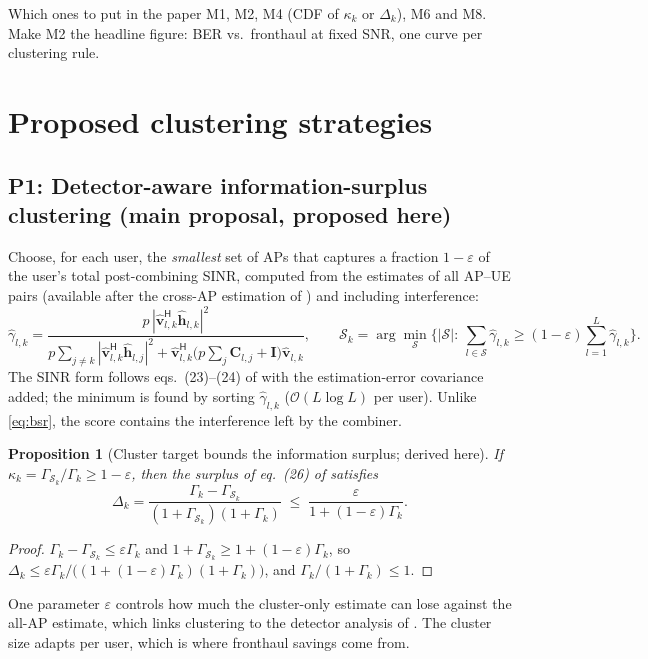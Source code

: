 \documentclass[11pt]{article}
\newtheorem{proposition}{Proposition}
\begin{document}
\begin{keybox}{Which ones to put in the paper}
M1, M2, M4 (CDF of $\kappa_k$ or $\Delta_k$), M6 and M8. Make M2 the headline figure: BER vs.\ fronthaul at fixed SNR, one curve per clustering rule.
\end{keybox}

\section{Proposed clustering strategies}
\label{sec:proposals}

\subsection{P1: Detector-aware information-surplus clustering (main proposal, proposed here)}
Choose, for each user, the \emph{smallest} set of APs that captures a fraction $1-\varepsilon$ of the user's total post-combining SINR, computed from the estimates of all AP--UE pairs (available after the cross-AP estimation of \cite{haider2026vtc}) and including interference:
\begin{equation}
  \hat\gamma_{l,k}=\frac{p\,|\hat{\mathbf v}_{l,k}^{\mathsf H}\hat{\mathbf h}_{l,k}|^2}
  {p\sum_{j\ne k}|\hat{\mathbf v}_{l,k}^{\mathsf H}\hat{\mathbf h}_{l,j}|^2+\hat{\mathbf v}_{l,k}^{\mathsf H}\big(p\sum_j\mathbf C_{l,j}+\mathbf I\big)\hat{\mathbf v}_{l,k}},
  \qquad
  \mathcal S_k=\arg\min_{\mathcal S}\Big\{|\mathcal S|:\ \sum_{l\in\mathcal S}\hat\gamma_{l,k}\ge(1-\varepsilon)\sum_{l=1}^L\hat\gamma_{l,k}\Big\}.
  \label{eq:p1}
\end{equation}
The SINR form follows eqs.~(23)--(24) of \cite{haider2026vtc} with the estimation-error covariance added; the minimum is found by sorting $\hat\gamma_{l,k}$ ($\mathcal O(L\log L)$ per user). Unlike \eqref{eq:bsr}, the score contains the interference left by the combiner.

\begin{proposition}[Cluster target bounds the information surplus; derived here]
If $\kappa_k=\Gamma_{\mathcal S_k}/\Gamma_k\ge 1-\varepsilon$, then the surplus of eq.~(26) of \cite{haider2026vtc} satisfies
\begin{equation}
  \Delta_k=\frac{\Gamma_k-\Gamma_{\mathcal S_k}}{(1+\Gamma_{\mathcal S_k})(1+\Gamma_k)}\;\le\;\frac{\varepsilon}{1+(1-\varepsilon)\Gamma_k}.
\end{equation}
\end{proposition}
\begin{proof}
$\Gamma_k-\Gamma_{\mathcal S_k}\le\varepsilon\Gamma_k$ and $1+\Gamma_{\mathcal S_k}\ge1+(1-\varepsilon)\Gamma_k$, so $\Delta_k\le \varepsilon\Gamma_k/\big((1+(1-\varepsilon)\Gamma_k)(1+\Gamma_k)\big)$, and $\Gamma_k/(1+\Gamma_k)\le1$.
\end{proof}
One parameter $\varepsilon$ controls how much the cluster-only estimate can lose against the all-AP estimate, which links clustering to the detector analysis of \cite{haider2026icassp,haider2026vtc}. The cluster size adapts per user, which is where fronthaul savings come from.
\end{document}
